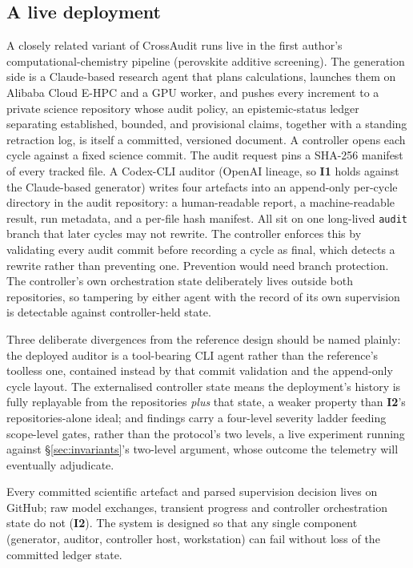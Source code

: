 \documentclass[11pt]{article}
\newcommand{\invariant}[1]{\textbf{I#1}}
\begin{document}
\subsection{A live deployment}

A closely related variant of CrossAudit runs live in the first author's computational-chemistry pipeline (perovskite additive screening). The generation side is a Claude-based research agent that plans calculations, launches them on Alibaba Cloud E-HPC and a GPU worker, and pushes every increment to a private science repository whose audit policy, an epistemic-status ledger separating established, bounded, and provisional claims, together with a standing retraction log, is itself a committed, versioned document. A controller opens each cycle against a fixed science commit. The audit request pins a SHA-256 manifest of every tracked file. A Codex-CLI auditor (OpenAI lineage, so \invariant{1} holds against the Claude-based generator) writes four artefacts into an append-only per-cycle directory in the audit repository: a human-readable report, a machine-readable result, run metadata, and a per-file hash manifest. All sit on one long-lived \texttt{audit} branch that later cycles may not rewrite. The controller enforces this by validating every audit commit before recording a cycle as final, which detects a rewrite rather than preventing one. Prevention would need branch protection. The controller's own orchestration state deliberately lives outside both repositories, so tampering by either agent with the record of its own supervision is detectable against controller-held state. 

Three deliberate divergences from the reference design should be named plainly: the deployed auditor is a tool-bearing CLI agent rather than the reference's toolless one, contained instead by that commit validation and the append-only cycle layout. The externalised controller state means the deployment's history is fully replayable from the repositories \emph{plus} that state, a weaker property than \invariant{2}'s repositories-alone ideal; and findings carry a four-level severity ladder feeding scope-level gates, rather than the protocol's two levels, a live experiment running against \S\ref{sec:invariants}'s two-level argument, whose outcome the telemetry will eventually adjudicate. 

Every committed scientific artefact and parsed supervision decision lives on GitHub; raw model exchanges, transient progress and controller orchestration state do not (\invariant{2}). The system is designed so that any single component (generator, auditor, controller host, workstation) can fail without loss of the committed ledger state.
\end{document}
